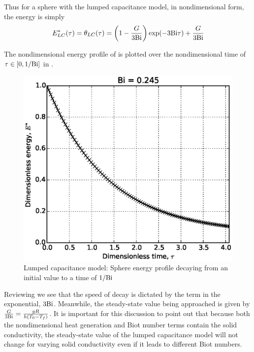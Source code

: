 Thus for a sphere with the lumped capacitance model, in nondimensional form, the energy is simply
\begin{equation}\label{eq:lc-energy-profile}
	E^*_{LC}(\tau) = \theta_{LC}(\tau) = \left(1-\frac{G}{3\mathrm{Bi}}\right)\exp(-3\mathrm{Bi} \tau) + \frac{G}{3\mathrm{Bi}}
\end{equation}

The nondimensional energy profile of  is plotted over the nondimensional time of $\tau \in [0,1/\mathrm{Bi}]$ in . 

\begin{figure}[ht]
	\centering
		\includegraphics[width=\singleimagewidth]{figures/LC-sphere-in-fluid}
	\caption[Lumped Capacitance energy profile]{Lumped capacitance model: Sphere energy profile decaying from an initial value to a time of $1/\mathrm{Bi}$}
	\label{fig:LC-sphere-in-fluid}
\end{figure}

Reviewing  we see that the speed of decay is dictated by the term in the exponential, $3\mathrm{Bi}$. Meanwhile, the steady-state value being approached is given by $\frac{G}{3\mathrm{Bi}} = \frac{gR}{h(T_0 - T_f)}$. It is important for this discussion to point out that because both the nondimensional heat generation and Biot number terms contain the solid conductivity, the steady-state value of the lumped capacitance model will not change for varying solid conductivity even if it leads to different Biot numbers.



